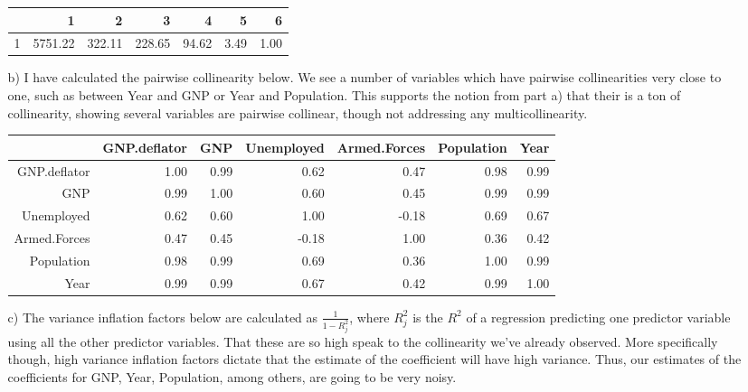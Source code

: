 \documentclass[11pt]{article}
\theoremstyle{definition}
\begin{document}
\begin{itemize}
\begin{itemize}
                \begin{table}[ht]
                    \centering
                    \begin{tabular}{rrrrrrr}
                          \hline
                           & 1 & 2 & 3 & 4 & 5 & 6 \\ 
                            \hline
                            1 & 5751.22 & 322.11 & 228.65 & 94.62 & 3.49 & 1.00 \\ 
                               \hline
                           \end{tabular}
                       \end{table}
            \item[b)] 
                I have calculated the pairwise collinearity below. We see a number of variables which have pairwise collinearities very close to one, such as between Year and GNP or Year and Population. This supports the notion from part a) that their is a ton of collinearity, showing several variables are pairwise collinear, though not addressing any multicollinearity. \\
                \begin{table}[ht]
                    \centering
                    \begin{tabular}{rrrrrrr}
                          \hline
                           & GNP.deflator & GNP & Unemployed & Armed.Forces & Population & Year \\ 
                            \hline
                            GNP.deflator & 1.00 & 0.99 & 0.62 & 0.47 & 0.98 & 0.99 \\ 
                              GNP & 0.99 & 1.00 & 0.60 & 0.45 & 0.99 & 0.99 \\ 
                              Unemployed & 0.62 & 0.60 & 1.00 & -0.18 & 0.69 & 0.67 \\ 
                              Armed.Forces & 0.47 & 0.45 & -0.18 & 1.00 & 0.36 & 0.42 \\ 
                              Population & 0.98 & 0.99 & 0.69 & 0.36 & 1.00 & 0.99 \\ 
                              Year & 0.99 & 0.99 & 0.67 & 0.42 & 0.99 & 1.00 \\ 
                               \hline
                           \end{tabular}
                       \end{table}
            \item[c)]
                The variance inflation factors below are calculated as \(\frac{1}{1-R_j^2}\), where \(R_j^2\) is the $R^2$ of a regression predicting one predictor variable using all the other predictor variables. That these are so high speak to the collinearity we've already observed. More specifically though, high variance inflation factors dictate that the estimate of the coefficient will have high variance. Thus, our estimates of the coefficients for GNP, Year, Population, among others, are going to be very noisy. \\

\end{itemize}
\end{itemize}
\end{document}
